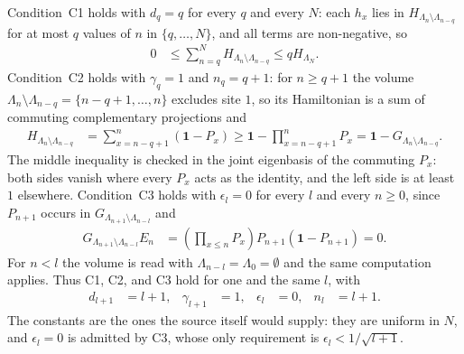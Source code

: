 \documentclass{article}
\begin{document}
Condition~C1 holds with $d_q=q$ for every $q$ and every $N$: each $h_x$ lies
in $H_{\Lambda_n\setminus\Lambda_{n-q}}$ for at most $q$ values of $n$ in
$\{q,\ldots,N\}$, and all terms are non-negative, so
\begin{align}
    0
        &\leq\sum_{n=q}^{N}H_{\Lambda_n\setminus\Lambda_{n-q}}
         \leq qH_{\Lambda_N}.
    \label{eq:nachtergaele96_theorem_2_1_lower_endpoint_model_c1}
\end{align}
Condition~C2 holds with $\gamma_q=1$ and $n_q=q+1$: for $n\geq q+1$ the
volume $\Lambda_n\setminus\Lambda_{n-q}=\{n-q+1,\ldots,n\}$ excludes site $1$,
so its Hamiltonian is a sum of commuting complementary projections and
\begin{align}
    H_{\Lambda_n\setminus\Lambda_{n-q}}
        &=\sum_{x=n-q+1}^{n}\left(\mathbf 1-P_x\right)
         \geq\mathbf 1-\prod_{x=n-q+1}^{n}P_x
         =\mathbf 1-G_{\Lambda_n\setminus\Lambda_{n-q}}.
    \label{eq:nachtergaele96_theorem_2_1_lower_endpoint_model_c2}
\end{align}
The middle inequality is checked in the joint eigenbasis of the commuting
$P_x$: both sides vanish where every $P_x$ acts as the identity, and the left
side is at least $1$ elsewhere. Condition~C3 holds with $\epsilon_l=0$ for
every $l$ and every $n\geq0$, since $P_{n+1}$ occurs in
$G_{\Lambda_{n+1}\setminus\Lambda_{n-l}}$ and
\begin{align}
    G_{\Lambda_{n+1}\setminus\Lambda_{n-l}}E_n
        &=\left(\prod_{x\leq n}P_x\right)
          P_{n+1}\left(\mathbf 1-P_{n+1}\right)
         =0.
    \label{eq:nachtergaele96_theorem_2_1_lower_endpoint_model_c3}
\end{align}
For $n<l$ the volume is read with $\Lambda_{n-l}=\Lambda_0=\emptyset$ and the
same computation applies. Thus C1, C2, and C3 hold for one and the same $l$,
with
\begin{align}
    d_{l+1}
        &=l+1,
    &
    \gamma_{l+1}
        &=1,
    &
    \epsilon_l
        &=0,
    &
    n_l
        &=l+1.
    \label{eq:nachtergaele96_theorem_2_1_lower_endpoint_model_constants}
\end{align}
The constants are the ones the source itself would supply: they are uniform in
$N$, and $\epsilon_l=0$ is admitted by C3, whose only requirement is
$\epsilon_l<1/\sqrt{l+1}$.
\end{document}

